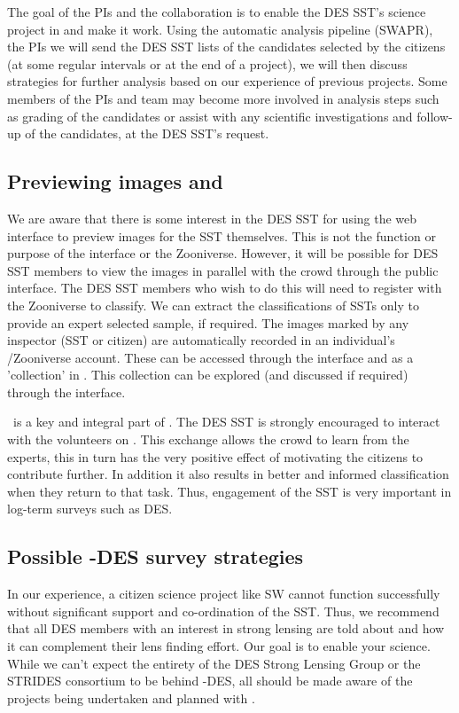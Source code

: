 \documentclass[a4paper,twocolumn]{article}
\begin{document}
The goal of the \SW PIs and the \SW collaboration is to enable the DES SST's science project in \sw and make it work. Using the automatic analysis pipeline (SWAPR), the \SW PIs we will send the DES SST lists of the candidates selected by the citizens (at some regular intervals or at the end of a project), we will then discuss strategies for further analysis based on our experience of previous projects. Some members of the \SW PIs  and team may become more involved in analysis steps such as grading of the \sw candidates or assist with any scientific investigations and follow-up of the candidates, at the DES SST's request. 

\subsection{Previewing images and \Talk}
We are aware that there is some interest in the DES SST for using the \SW web interface to preview images for the SST themselves. This is not the function or purpose of the \SW interface or the Zooniverse. However,  it will be possible for DES SST members to view the images in parallel with the crowd through the public interface.  The DES SST members who wish to do this will need to register with the Zooniverse to classify. We can extract the classifications of SSTs only to provide an expert selected sample, if required. The images marked by any inspector (SST or citizen)  are automatically recorded in an individual's \SW/Zooniverse account. These can be accessed through the \SW interface and as a 'collection' in \Talk. This collection can be explored (and discussed if required) through the \Talk interface.

\SW\ \Talk is a key and integral part of \SW. The DES SST is strongly encouraged to interact with the volunteers on \Talk. This exchange allows the crowd to learn from the experts, this in turn has the very positive effect of motivating the citizens to contribute further. In addition it also results in better and informed classification when they return to that task. Thus, engagement of the SST is very important in log-term surveys such as DES.

\subsection{Possible \SW-DES survey strategies}

In our experience, a citizen science project like SW cannot function successfully without significant support and co-ordination of the SST. Thus, we recommend that all DES members with an interest in strong lensing are told about \SW and how it can complement their lens finding effort. Our goal is to enable your science. While we can't expect the entirety of the DES Strong Lensing Group or the STRIDES consortium to be behind \SW-DES, all should be made aware of the projects being undertaken and planned with \SW.
\end{document}
